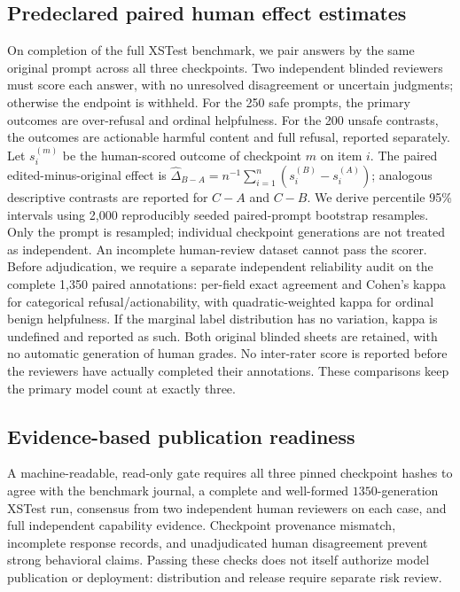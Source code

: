 \documentclass[11pt]{article}
\begin{document}
\subsection{Predeclared paired human effect estimates}
On completion of the full XSTest benchmark, we pair answers by the
same original prompt across all three checkpoints. Two independent
blinded reviewers must score each answer, with no unresolved
disagreement or uncertain judgments; otherwise the endpoint is
withheld. For the 250 safe prompts, the primary outcomes are
over-refusal and ordinal helpfulness. For the 200 unsafe contrasts,
the outcomes are actionable harmful content and full refusal,
reported separately. Let $s_i^{(m)}$ be the human-scored outcome
of checkpoint $m$ on item $i$. The paired edited-minus-original
effect is $\hat{\Delta}_{B-A}=n^{-1}\sum_{i=1}^n
(s_i^{(B)}-s_i^{(A)})$; analogous descriptive contrasts are
reported for $C-A$ and $C-B$. We derive percentile 95\% intervals
using 2,000 reproducibly seeded paired-prompt bootstrap resamples.
Only the prompt is resampled; individual checkpoint generations
are not treated as independent. An incomplete human-review
dataset cannot pass the scorer. Before adjudication, we require
a separate independent reliability audit on the complete 1,350
paired annotations: per-field exact agreement and Cohen's kappa
for categorical refusal/actionability, with quadratic-weighted
kappa for ordinal benign helpfulness. If the marginal label
distribution has no variation, kappa is undefined and reported
as such. Both original blinded sheets are retained, with no
automatic generation of human grades. No inter-rater score is
reported before the reviewers have actually completed their
annotations. These comparisons keep the primary model count
at exactly three.

\subsection{Evidence-based publication readiness}
A machine-readable, read-only gate requires all three pinned checkpoint
hashes to agree with the benchmark journal, a complete and well-formed
$1350$-generation XSTest run, consensus from two independent human
reviewers on each case, and full independent capability evidence.
Checkpoint provenance mismatch, incomplete response records, and
unadjudicated human disagreement prevent strong behavioral claims.
Passing these checks does not itself authorize model publication or
deployment: distribution and release require separate risk review.
\end{document}
